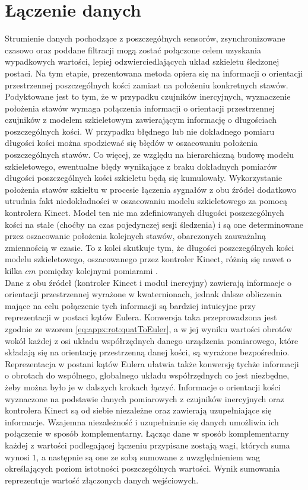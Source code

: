 \section{Łączenie danych}

Strumienie danych pochodzące z poszczegółnych sensorów, zsynchronizowane czasowo oraz poddane filtracji mogą zostać połączone celem uzyskania wypadkowych wartości, lepiej odzwierciedlających układ szkieletu śledzonej postaci. Na tym etapie, prezentowana metoda opiera się na informacji o orientacji przestrzennej poszczególnych kości zamiast na położeniu konkretnych stawów. Podyktowane jest to tym, że w przypadku czujników inercyjnych, wyznaczenie położenia stawów wymaga połączenia informacji o orientacji przestrzennej czujników z modelem szkieletowym zawierającym informację o długościach poszczególnych kości. W przypadku błędnego lub nie dokładnego pomiaru długości kości można spodziewać się błędów w oszacowaniu położenia poszczególnych stawów. Co więcej, ze względu na hierarchiczną budowę modelu szkieletowego, ewentualne błędy wynikające z braku dokładnych pomiarów długości poszczególnych kości szkieletu będą się kumulowały. 
Wykorzystanie położenia stawów szkieltu w procesie łączenia sygnałów z obu źródeł dodatkowo utrudnia fakt niedokładności w oszacowaniu modelu szkieletowego za pomocą kontrolera Kinect. Model ten nie ma zdefiniowanych długości poszczególnych kości na stałe (choćby na czas pojedynczej sesji śledzenia) i są one determinowane przez oszacowanie położenia kolejnych stawów, obarczonych zauważalną zmiennością w czasie. To z kolei skutkuje tym, że długości poszczególnych kości modelu szkieletowego, oszacowanego przez kontroler Kinect, różnią się nawet o kilka $cm$ pomiędzy kolejnymi pomiarami .\\

Dane z obu źródeł (kontroler Kinect i moduł inercyjny) zawierają informacje o orientacji przestrzennej wyrażone w kwaternionach, jednak dalsze obliczenia mające na celu połączenie tych informacji są bardziej intuicyjne przy reprezentacji w postaci kątów Eulera. Konwersja taka przeprowadzona jest zgodnie ze wzorem \eqref{eq:appx:rot:quatToEuler}, a w jej wyniku wartości obrotów wokół każdej z osi układu współrzędnych danego urządzenia pomiarowego, które składają się na orientację przestrzenną danej kości, są wyrażone bezpośrednio. Reprezentacja w postani kątów Eulera ułatwia także konwersję tychże informacji o obrotach do wspólnego, globalnego układu współrzędnych co jest niezbędne, żeby można było je w dalszych krokach łączyć. 
Informacje o orientacji kości wyznaczone na podstawie danych pomiarowych z czujników inercyjnych oraz kontrolera Kinect są od siebie niezależne oraz zawierają uzupełniające się informacje. Wzajemna niezależność i uzupełnianie się danych umożliwia ich połączenie w sposób komplementarny. Łącząc dane w sposób komplementarny każdej z wartości podlegającej łączeniu przypisane zostają wagi, których suma wynosi $1$, a następnie są one ze sobą sumowane z uwzględnieniem wag określających poziom istotności poszczególnych wartości. Wynik sumowania reprezentuje wartość złączonych danych wejściowych. \\
 
